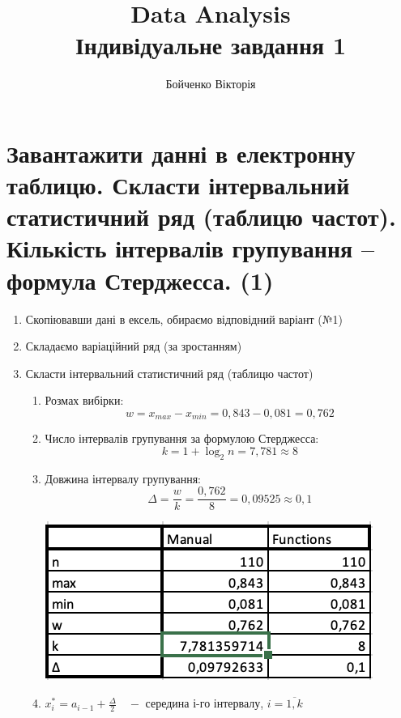 \documentclass[14pt]{extarticle}
\title{Data Analysis \\  Індивідуальне завдання 1}
\author{Бойченко Вікторія}
\date{}
\begin{document}
\maketitle

\section{ Завантажити данні в електронну таблицю. Скласти інтервальний статистичний ряд (таблицю частот). Кількість інтервалів групування – формула Стерджесса. (1)}

\begin{enumerate}

\item  Скопіювавши дані в ексель, обираємо відповідний варіант (№1)

\item Складаємо варіаційний ряд (за зростанням)

\item Скласти інтервальний статистичний ряд (таблицю частот)

\begin{enumerate}

\item Розмах вибірки:
\[ w = x_{max} - x_{min} = 0,843 - 0,081 = 0,762 \] 

\item Число інтервалів групування за формулою Стерджесса:
\[ k = 1 + \log_2{n} = 7,781 \approx 8 \] 

\item Довжина інтервалу групування:
\[ \Delta = \frac{w}{k} =  \frac{0,762}{8} = 0,09525 \approx 0,1\]

\includegraphics[width=\textwidth/2]{zvit1-start}


\item $x_i^* = a_{i-1} + \frac{\Delta}{2} \quad - $ середина і-го інтервалу, $i=\overline{1,k}$ 


\end{enumerate}
\end{enumerate}
\end{document}
